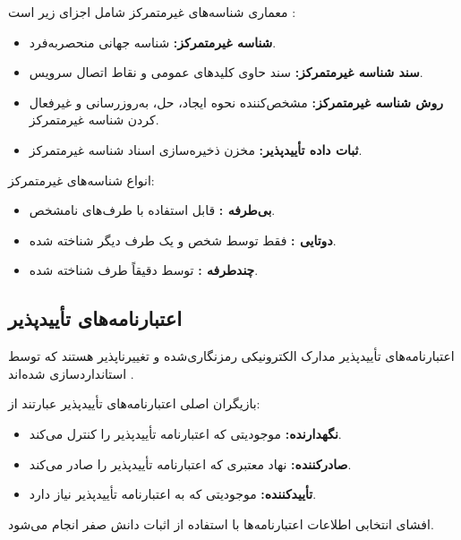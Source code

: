 \documentclass[12pt,a4paper]{article}
\begin{document}
معماری شناسه‌های غیرمتمرکز شامل اجزای زیر است \cite{mazzocca2025survey}:

\begin{itemize}
  \item \textbf{شناسه غیرمتمرکز:} شناسه جهانی منحصربه‌فرد.
  \item \textbf{سند شناسه غیرمتمرکز:} سند  حاوی کلیدهای عمومی و نقاط اتصال سرویس.
  \item \textbf{روش شناسه غیرمتمرکز:} مشخص‌کننده نحوه ایجاد، حل، به‌روزرسانی و غیرفعال کردن شناسه غیرمتمرکز.
  \item \textbf{ثبات داده تأییدپذیر:} مخزن ذخیره‌سازی اسناد شناسه غیرمتمرکز.
\end{itemize}

انواع شناسه‌های غیرمتمرکز:

\begin{itemize}
  \item \textbf{بی‌طرفه :} قابل استفاده با طرف‌های نامشخص.
  \item \textbf{دوتایی :} فقط توسط شخص و یک طرف دیگر شناخته شده.
  \item \textbf{چندطرفه :} توسط دقیقاً  طرف شناخته شده.
\end{itemize}

\subsection{اعتبارنامه‌های تأییدپذیر }

اعتبارنامه‌های تأییدپذیر مدارک الکترونیکی رمزنگاری‌شده و تغییرناپذیر هستند که توسط  استانداردسازی شده‌اند \cite{mazzocca2025survey}.

بازیگران اصلی اعتبارنامه‌های تأییدپذیر عبارتند از:

\begin{itemize}
  \item \textbf{نگهدارنده:} موجودیتی که اعتبارنامه تأییدپذیر را کنترل می‌کند.
  \item \textbf{صادرکننده:} نهاد معتبری که اعتبارنامه تأییدپذیر را صادر می‌کند.
  \item \textbf{تأییدکننده:} موجودیتی که به اعتبارنامه تأییدپذیر نیاز دارد.
\end{itemize}

افشای انتخابی اطلاعات اعتبارنامه‌ها با استفاده از اثبات دانش صفر انجام می‌شود.
\end{document}
